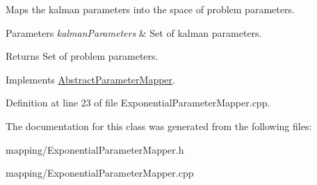Maps the kalman parameters into the space of problem parameters. 
\begin{DoxyParams}{Parameters}
{\em kalman\+Parameters} & Set of kalman parameters. \\
\hline
\end{DoxyParams}
\begin{DoxyReturn}{Returns}
Set of problem parameters. 
\end{DoxyReturn}


Implements \mbox{\hyperlink{classAbstractParameterMapper_a7fc9715759582e218a3bc38ec43e2d57}{Abstract\+Parameter\+Mapper}}.



Definition at line 23 of file Exponential\+Parameter\+Mapper.\+cpp.



The documentation for this class was generated from the following files\+:\begin{DoxyCompactItemize}
\item 
mapping/Exponential\+Parameter\+Mapper.\+h\item 
mapping/Exponential\+Parameter\+Mapper.\+cpp\end{DoxyCompactItemize}
